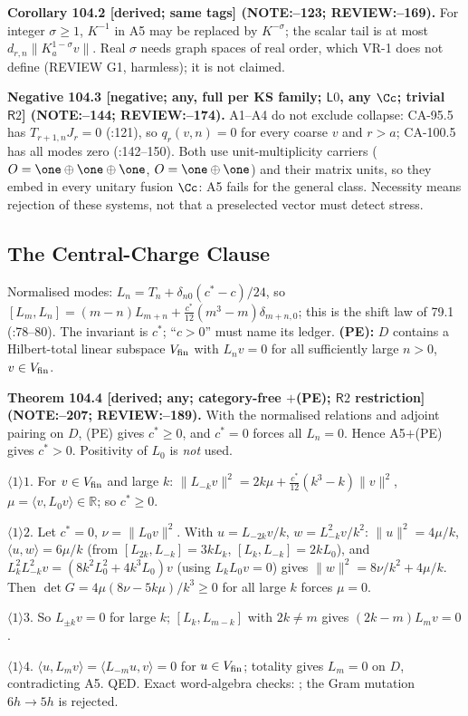 \textbf{Corollary 104.2 [derived; same tags] (NOTE:--123; REVIEW:--169).}
For integer \(\sigma\ge1\), \(K^{-1}\) in A5 may be replaced by \(K^{-\sigma}\); the scalar tail is at most \(d_{r,n}\|K_a^{1-\sigma}v\|\).
Real \(\sigma\) needs graph spaces of real order, which VR-1 does not define (REVIEW G1, harmless); it is not claimed.

\textbf{Negative 104.3 [negative; any, full per KS family; \(\mathsf L0\), any \(\Cc\); trivial \(\mathsf R2\)] (NOTE:--144; REVIEW:--174).}
A1--A4 do not exclude collapse: CA-95.5 has \(T_{r+1,n}J_r=0\) (:121), so \(q_r(v,n)=0\) for
every coarse \(v\) and \(r>a\); CA-100.5 has all modes zero (:142--150). Both use
unit-multiplicity carriers (\(O=\one\oplus\one\oplus\one\), \(O=\one\oplus\one\)) and their matrix units, so they embed in every unitary
fusion \(\Cc\): A5 fails for the general class. Necessity means rejection of these systems, not that a preselected vector must detect stress.

\subsection{The Central-Charge Clause}

Normalised modes: \(L_n=T_n+\delta_{n0}(c^*-c)/24\), so \([L_m,L_n]=(m-n)L_{m+n}+\tfrac{c^*}{12}(m^3-m)\delta_{m+n,0}\); this is the shift
law of 79.1 (:78--80). The invariant is \(c^*\); ``\(c>0\)'' must name its ledger.
\textbf{(PE):} \(D\) contains a Hilbert-total linear subspace \(V_{\rm fin}\) with \(L_nv=0\) for all sufficiently large \(n>0\), \(v\in V_{\rm fin}\).

\textbf{Theorem 104.4 [derived; any; category-free \(+\)(PE); \(\mathsf R2\) restriction] (NOTE:--207; REVIEW:--189).}
With the normalised relations and adjoint pairing on \(D\), (PE) gives \(c^*\ge0\), and \(c^*=0\) forces all \(L_n=0\).
Hence A5\(+\)(PE) gives \(c^*>0\). Positivity of \(L_0\) is \emph{not} used.
\par\(\langle1\rangle1\). For \(v\in V_{\rm fin}\) and large \(k\): \(\|L_{-k}v\|^2=2k\mu+\tfrac{c^*}{12}(k^3-k)\|v\|^2\), \(\mu=\langle v,L_0v\rangle\in\mathbb R\);
so \(c^*\ge0\).
\par\(\langle1\rangle2\). Let \(c^*=0\), \(\nu=\|L_0v\|^2\). With \(u=L_{-2k}v/k\), \(w=L_{-k}^2v/k^2\): \(\|u\|^2=4\mu/k\),
\(\langle u,w\rangle=6\mu/k\) (from \([L_{2k},L_{-k}]=3kL_k\), \([L_k,L_{-k}]=2kL_0\)), and \(L_k^2L_{-k}^2v=(8k^2L_0^2+4k^3L_0)v\) (using
\(L_kL_0v=0\)) gives \(\|w\|^2=8\nu/k^2+4\mu/k\). Then \(\det G=4\mu(8\nu-5k\mu)/k^3\ge0\) for all large \(k\) forces \(\mu=0\).
\par\(\langle1\rangle3\). So \(L_{\pm k}v=0\) for large \(k\); \([L_k,L_{m-k}]\) with \(2k\neq m\) gives \((2k-m)L_mv=0\).
\par\(\langle1\rangle4\). \(\langle u,L_mv\rangle=\langle L_{-m}u,v\rangle=0\) for \(u\in V_{\rm fin}\); totality gives \(L_m=0\) on \(D\), contradicting A5. QED.
Exact word-algebra checks: ; the Gram mutation \(6h\to5h\) is rejected.

